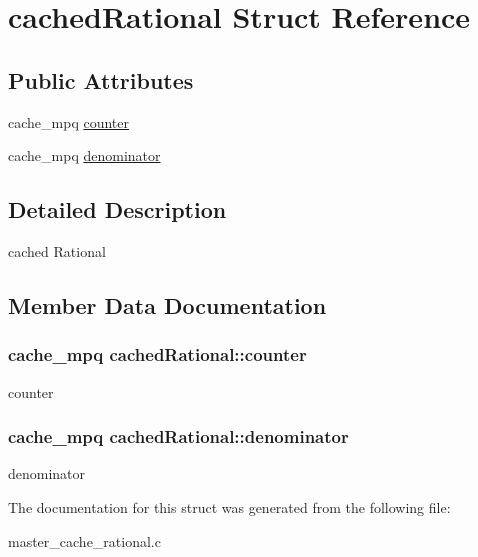 \hypertarget{structcachedRational}{}\section{cached\+Rational Struct Reference}
\label{structcachedRational}
\subsection*{Public Attributes}
\begin{DoxyCompactItemize}
\item 
cache\+\_\+mpq \hyperlink{structcachedRational_af4bc91012e94d43c4f50e15db3a6b4ea}{counter}
\item 
cache\+\_\+mpq \hyperlink{structcachedRational_a319e0c2eb1d91bcb7cd04a32c7a8dbb7}{denominator}
\end{DoxyCompactItemize}


\subsection{Detailed Description}
cached Rational 

\subsection{Member Data Documentation}
\subsubsection[{\texorpdfstring{counter}{counter}}]{\setlength{\rightskip}{0pt plus 5cm}cache\+\_\+mpq cached\+Rational\+::counter}\hypertarget{structcachedRational_af4bc91012e94d43c4f50e15db3a6b4ea}{}\label{structcachedRational_af4bc91012e94d43c4f50e15db3a6b4ea}
counter 
\subsubsection[{\texorpdfstring{denominator}{denominator}}]{\setlength{\rightskip}{0pt plus 5cm}cache\+\_\+mpq cached\+Rational\+::denominator}\hypertarget{structcachedRational_a319e0c2eb1d91bcb7cd04a32c7a8dbb7}{}\label{structcachedRational_a319e0c2eb1d91bcb7cd04a32c7a8dbb7}
denominator 

The documentation for this struct was generated from the following file\+:\begin{DoxyCompactItemize}
\item 
master\+\_\+cache\+\_\+rational.\+c\end{DoxyCompactItemize}
